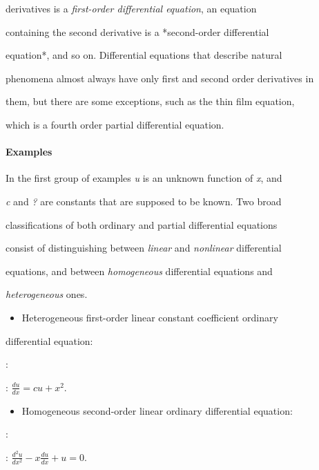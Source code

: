 derivatives is a \textit{first-order differential equation}, an equation

containing the second derivative is a *second-order differential

equation*, and so on. Differential equations that describe natural

phenomena almost always have only first and second order derivatives in

them, but there are some exceptions, such as the thin film equation,

which is a fourth order partial differential equation.



\paragraph{Examples}



In the first group of examples \textit{u} is an unknown function of \textit{x}, and

\textit{c} and \textit{?} are constants that are supposed to be known. Two broad

classifications of both ordinary and partial differential equations

consist of distinguishing between \textit{linear} and \textit{nonlinear} differential

equations, and between \textit{homogeneous} differential equations and

\textit{heterogeneous} ones.



\begin{itemize}
    \item Heterogeneous first-order linear constant coefficient ordinary
\end{itemize}
    differential equation:



:   



    :   $\frac{du}{dx} = cu+x^2.$



\begin{itemize}
    \item Homogeneous second-order linear ordinary differential equation:
\end{itemize}

:   



    :   $\frac{d^2u}{dx^2} - x\frac{du}{dx} + u = 0.$



